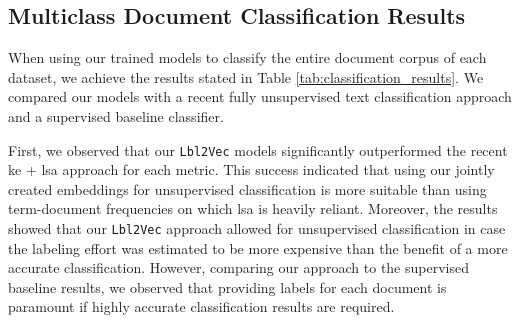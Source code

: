 \documentclass[a4paper,twoside]{article}
\begin{document}
\subsection{Multiclass Document Classification Results}
When using our trained models to classify the entire document corpus of each dataset, we achieve the results stated in Table \ref{tab:classification_results}. We compared our models with a recent fully unsupervised text classification approach and a supervised baseline classifier.
\begin{table}[ht]
\centering
{}\caption{\label{tab:classification_results}Performance of our \texttt{Lbl2Vec} models when classifying all documents in the respective corpus. \ac{ke} + \ac{lsa} refers to the best possible fully unsupervised classification results of \citet{haj-yahia-etal-2019-towards} on the datasets. The last row states their baseline classification results of a supervised multinomial Na\"ive Bayes approach. As we used micro-averaging to calculate our classification metrics, we realized equal F1, Precision, and Recall scores within each model.}
\end{table}
First, we observed that our \texttt{Lbl2Vec} models significantly outperformed the recent \ac{ke} + \ac{lsa} approach for each metric. This success indicated that using our jointly created embeddings for unsupervised classification is more suitable than using term-document frequencies on which \ac{lsa} is heavily reliant. Moreover, the results showed that our \texttt{Lbl2Vec} approach allowed for unsupervised classification in case the labeling effort was estimated to be more expensive than the benefit of a more accurate classification. However, comparing our approach to the supervised baseline results, we observed that providing labels for each document is paramount if highly accurate classification results are required. 
\end{document}
